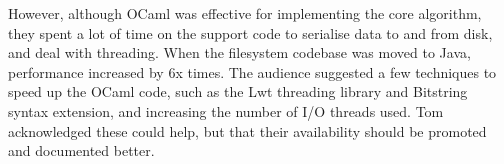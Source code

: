 \documentclass{jfp1}
\begin{document}
However, although OCaml was effective for implementing the core
algorithm, they spent a lot of time on the support code to serialise
data to and from disk, and deal with threading. When the filesystem
codebase was moved to Java, performance increased by 6x times. The
audience suggested a few techniques to speed up the OCaml code, such as
the Lwt threading library and Bitstring syntax extension, and increasing
the number of I/O threads used. Tom acknowledged these could help, but
that their availability should be promoted and documented better.
\end{document}
